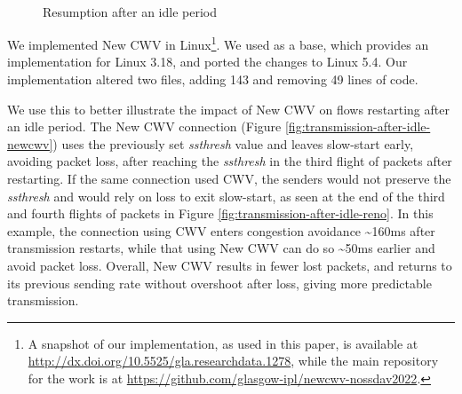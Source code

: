 \documentclass[10pt,sigconf]{acmart}
\begin{document}
\begin{figure}[t!]
  \centering
  \\
  \caption{Resumption after an idle period}
  \label{fig:transmission-after-idle}
\end{figure}

We implemented New CWV in Linux\footnote{A snapshot of our implementation, as used in this paper, is available at \url{http://dx.doi.org/10.5525/gla.researchdata.1278}, while the main repository for the work is at \url{https://github.com/glasgow-ipl/newcwv-nossdav2022}.}. We used \cite{secchi-2016-newcwv} as a base, which provides an implementation for Linux 3.18, and ported the changes to Linux 5.4. Our implementation altered two files, adding 143 and removing 49 lines of code.

We use this to better illustrate the impact of New CWV on flows restarting after an idle period.
The New CWV connection (Figure \ref{fig:transmission-after-idle-newcwv}) uses the previously set \emph{ssthresh} value and leaves slow-start early, avoiding packet loss, after reaching the \emph{ssthresh} in the third flight of packets after restarting. 
If the same connection used CWV, the senders would not preserve the \emph{ssthresh} and would rely on loss to exit slow-start, as seen at the end of the third and fourth flights of packets in Figure \ref{fig:transmission-after-idle-reno}. In this example, the connection using CWV enters congestion avoidance \textasciitilde160ms after transmission restarts, while that using New CWV can do so \textasciitilde50ms earlier and avoid packet loss.
Overall, New CWV results in fewer lost packets, and returns to its previous sending rate without overshoot after loss, giving more predictable transmission.
\end{document}
